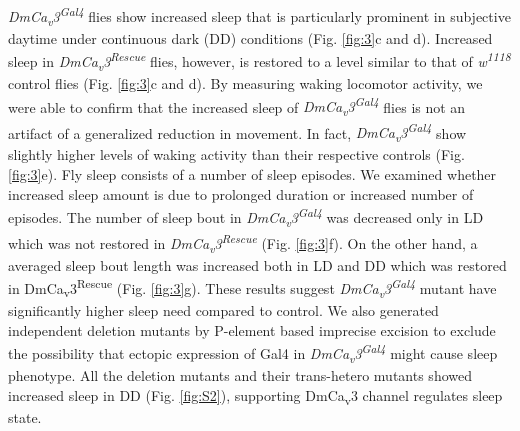 \emph{DmCa\textsubscript{v}3\textsuperscript{Gal4}} flies show increased sleep that is particularly prominent in subjective daytime under continuous dark (DD) conditions (Fig. \ref{fig:3}c and d).
Increased sleep in \emph{DmCa\textsubscript{v}3\textsuperscript{Rescue}} flies, however, is restored to a level similar to that of \emph{w\textsuperscript{1118}} control flies (Fig. \ref{fig:3}c and d).
By measuring waking locomotor activity, we were able to confirm that the increased sleep of \emph{DmCa\textsubscript{v}3\textsuperscript{Gal4}} flies is not an artifact of a generalized reduction in movement. In fact, \emph{DmCa\textsubscript{v}3\textsuperscript{Gal4}} show slightly higher levels of waking activity than their respective controls (Fig. \ref{fig:3}e).
Fly sleep consists of a number of sleep episodes.
We examined whether increased sleep amount is due to prolonged duration or increased number of episodes.
The number of sleep bout in \emph{DmCa\textsubscript{v}3\textsuperscript{Gal4}} was decreased only in LD which was not restored in \emph{DmCa\textsubscript{v}3\textsuperscript{Rescue}} (Fig. \ref{fig:3}f).
On the other hand, a averaged sleep bout length was increased both in LD and DD which was restored in DmCa\textsubscript{v}3\textsuperscript{Rescue} (Fig. \ref{fig:3}g).
These results suggest \emph{DmCa\textsubscript{v}3\textsuperscript{Gal4}} mutant have significantly higher sleep need compared to control.
We also generated independent deletion mutants by P-element based imprecise excision to exclude the possibility that ectopic expression of Gal4 in \emph{DmCa\textsubscript{v}3\textsuperscript{Gal4}} might cause sleep phenotype.
All the deletion mutants and their trans-hetero mutants showed increased sleep in DD (Fig. \ref{fig:S2}), supporting DmCa\textsubscript{v}3 channel regulates sleep state.
    
  
  
  
  
  